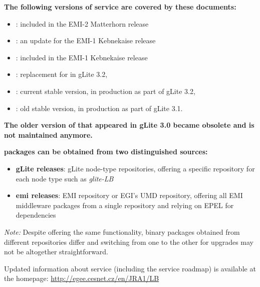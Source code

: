 \textbf{The following versions of \LB service are covered by these documents:}
\begin{itemize}
\item {}: included in the EMI-2 Matterhorn release
\item {}: an update for the EMI-1 Kebnekaise release
\item {}: included in the EMI-1 Kebnekaise release
\item {}: replacement for  in gLite 3.2,
\item {}: current stable version, in production as part of gLite 3.2,
\item {}: old stable version, in production as part of gLite 3.1.
\end{itemize}
\textbf{The older version of \LB that appeared in gLite 3.0 became obsolete and is not maintained anymore.}

\textbf{\LB packages can be obtained from two distinguished sources:}

\begin{itemize}
\item \textbf{gLite releases}: gLite node-type repositories, offering a specific repository for each node type such as \emph{glite-LB}
\item \textbf{emi releases}: EMI repository or EGI's UMD repository, offering all EMI middleware packages from a single repository and relying on EPEL for dependencies
\end{itemize}

\emph{Note:} Despite offering the same functionality, binary packages obtained from different repositories differ and switching from one to the other for upgrades may not be altogether straightforward.

Updated information about \LB service (including the \LB service roadmap) is available at the
\LB homepage:
\href{http://egee.cesnet.cz/en/JRA1/LB}{http://egee.cesnet.cz/en/JRA1/LB}

